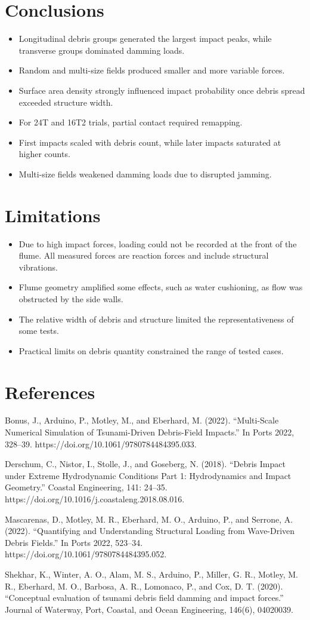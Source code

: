 \documentclass{article}
\begin{document}
\section{Conclusions}
\begin{itemize}
    \item Longitudinal debris groups generated the largest impact peaks, while transverse groups dominated damming loads.
    \item Random and multi-size fields produced smaller and more variable forces.
    \item Surface area density strongly influenced impact probability once debris spread exceeded structure width.
    \item For 24T and 16T2 trials, partial contact required remapping.
    \item First impacts scaled with debris count, while later impacts saturated at higher counts.
    \item Multi-size fields weakened damming loads due to disrupted jamming.
\end{itemize}

\section{Limitations}
\begin{itemize}
    \item Due to high impact forces, loading could not be recorded at the front of the flume. All measured forces are reaction forces and include structural vibrations.
    \item Flume geometry amplified some effects, such as water cushioning, as flow was obstructed by the side walls.
    \item The relative width of debris and structure limited the representativeness of some tests.
    \item Practical limits on debris quantity constrained the range of tested cases.
\end{itemize}
\section{References}
Bonus, J., Arduino, P., Motley, M., and Eberhard, M. (2022). ``Multi-Scale Numerical Simulation of Tsunami-Driven Debris-Field Impacts.'' In Ports 2022, 328--39. https://doi.org/10.1061/9780784484395.033.

Derschum, C., Nistor, I., Stolle, J., and Goseberg, N. (2018). ``Debris Impact under Extreme Hydrodynamic Conditions Part 1: Hydrodynamics and Impact Geometry.'' Coastal Engineering, 141: 24--35. https://doi.org/10.1016/j.coastaleng.2018.08.016.

Mascarenas, D., Motley, M. R., Eberhard, M. O., Arduino, P., and Serrone, A. (2022). ``Quantifying and Understanding Structural Loading from Wave-Driven Debris Fields.'' In Ports 2022, 523--34. https://doi.org/10.1061/9780784484395.052.

Shekhar, K., Winter, A. O., Alam, M. S., Arduino, P., Miller, G. R., Motley, M. R., Eberhard, M. O., Barbosa, A. R., Lomonaco, P., and Cox, D. T. (2020). ``Conceptual evaluation of tsunami debris field damming and impact forces.'' Journal of Waterway, Port, Coastal, and Ocean Engineering, 146(6), 04020039.
\end{document}
